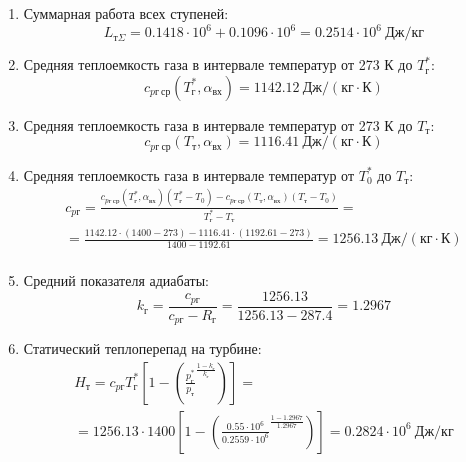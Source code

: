 \documentclass[a4paper,10pt]{article}
\begin{document}
    
    \begin{enumerate}

        \item Суммарная работа всех ступеней:
        \[
            L_{т\Sigma} = 0.1418\cdot 10^6+0.1096\cdot 10^6 = 0.2514 \cdot 10^6 \ Дж/кг
        \]

        \item Средняя теплоемкость газа в интервале температур от 273 К до $T_г^*$:
        \[
            c_{pг\ ср} (T_г^*, \alpha_{вх}) =
            1142.12 \ Дж/(кг \cdot К)
        \]

        \item Средняя теплоемкость газа в интервале температур от 273 К до $T_т$:
        \[
            c_{pг\ ср} (T_т, \alpha_{вх}) =
            1116.41 \ Дж/(кг \cdot К)
        \]

        \item Средняя теплоемкость газа в интервале температур от $T_0^*$ до $T_т$:
        \begin{gather*}
            c_{pг} = \frac{
		         c_{pг\ ср} (T_г^*, \alpha_{вх}) (T_г^* - T_0) - c_{pг\ ср} (T_{т}, \alpha_{вх})(T_т - T_0)
		    }{
		        T_г^* - T_т} =\\
            =\frac{
                1142.12 \cdot
                (1400 - 273) -
		        1116.41 \cdot
                (1192.61 - 273)
		    }{
		        1400 - 1192.61} =
		    1256.13 \ Дж / (кг \cdot К)\\
        \end{gather*}

        \item Средний показателя адиабаты:
        \[
            k_г = \frac{c_{pг}}{c_{pг} - R_г} =
                \frac{
                    1256.13
                }{
                    1256.13 - 287.4
                }
            = 1.2967
        \]

        \item Статический теплоперепад на турбине:
        \begin{gather*}
            H_т = c_{pг} T_г^* \left[
                        1 - \left(
                                \frac{p_г^*}{p_т} ^
                                \frac{1 - k_г}{k_г}
                    \right)
                \right] =\\
            = 1256.13 \cdot 1400
                \left[
                    1 - \left(
                            \frac{
                                0.55 \cdot 10^6
                            }{
                                0.2559 \cdot 10^6 } ^
                            \frac{ 1 - 1.2967 }{ 1.2967 }
                    \right)
            \right] =
            0.2824 \cdot 10^6 \ Дж/кг\\
        \end{gather*}


\end{enumerate}
\end{document}

